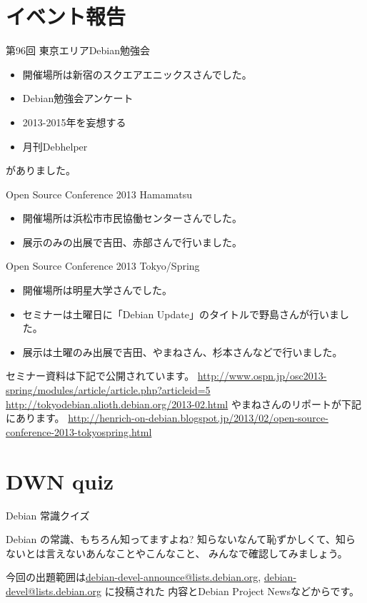 \section{イベント報告}
\begin{frame}{第96回 東京エリアDebian勉強会}
\begin{itemize}
\item 開催場所は新宿のスクエアエニックスさんでした。
\item Debian勉強会アンケート
\item 2013-2015年を妄想する
\item 月刊Debhelper
\end{itemize}
がありました。
\end{frame}
\begin{frame}{Open Source Conference 2013 Hamamatsu}
\begin{itemize}
\item 開催場所は浜松市市民協働センターさんでした。
\item 展示のみの出展で吉田、赤部さんで行いました。
\end{itemize}
\end{frame}
\begin{frame}{Open Source Conference 2013 Tokyo/Spring}
\begin{itemize}
\item 開催場所は明星大学さんでした。
\item セミナーは土曜日に「Debian Update」のタイトルで野島さんが行いました。
\item 展示は土曜のみ出展で吉田、やまねさん、杉本さんなどで行いました。
\end{itemize}
セミナー資料は下記で公開されています。
\url{http://www.ospn.jp/osc2013-spring/modules/article/article.php?articleid=5}
\url{http://tokyodebian.alioth.debian.org/2013-02.html}
やまねさんのリポートが下記にあります。
\url{http://henrich-on-debian.blogspot.jp/2013/02/open-source-conference-2013-tokyospring.html}

\end{frame}

\section{DWN quiz}
\begin{frame}{Debian 常識クイズ}

Debian の常識、もちろん知ってますよね?
知らないなんて恥ずかしくて、知らないとは言えないあんなことやこんなこと、
みんなで確認してみましょう。

今回の出題範囲は\url{debian-devel-announce@lists.debian.org},
\url{debian-devel@lists.debian.org} に投稿された
内容とDebian Project Newsなどからです。

\end{frame}

